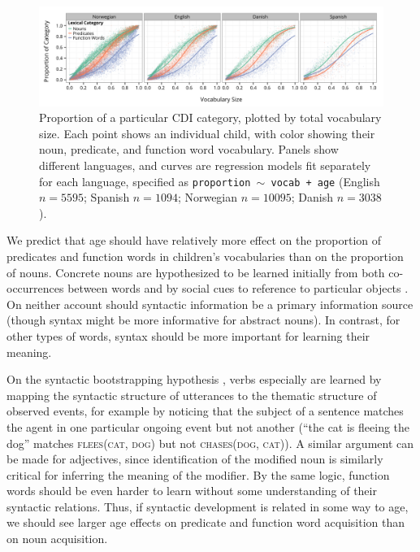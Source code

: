 \documentclass[10pt,letterpaper]{article}
\begin{document}
\begin{figure}
\begin{center}
\includegraphics[width=\linewidth]{plots/vocab_data_plot-1.png}
\end{center}
\caption{\label{fig:vocab_comp} Proportion of a particular CDI category, plotted by total vocabulary size. Each point shows an individual child, with color showing their noun, predicate, and function word vocabulary. Panels show different languages, and curves are regression models fit separately for each language, specified as \small{\tt{proportion $\sim$ vocab + age}} (English $n=5595$; Spanish $n=1094$; Norwegian $n=10095$; Danish $n=3038$).}
\end{figure}

We predict that age should have relatively more effect on the proportion of predicates and function words in children's vocabularies than on the proportion of nouns. Concrete nouns are hypothesized to be learned initially from both co-occurrences between words \cite{yu2007b} and by social cues to reference to particular objects \cite{bloom2002}. On neither account should syntactic information be a primary information source (though syntax might be more informative for abstract nouns). In contrast, for other types of words, syntax should be more important for learning their meaning.

On the syntactic bootstrapping hypothesis \cite{gleitman1990,fisher2010}, verbs especially are learned by mapping the syntactic structure of utterances to the thematic structure of observed events, for example by noticing that the subject of a sentence matches the agent in one particular ongoing event but not another (``the cat is fleeing the dog'' matches \textsc{flees(cat, dog)} but not \textsc{chases(dog, cat)}). A similar argument can be made for adjectives, since identification of the modified noun is similarly critical for inferring the meaning of the modifier. By the same logic, function words should be even harder to learn without some understanding of their syntactic relations. Thus, if syntactic development is related in some way to age, we should see larger age effects on predicate and function word acquisition than on noun acquisition. 
\end{document}
